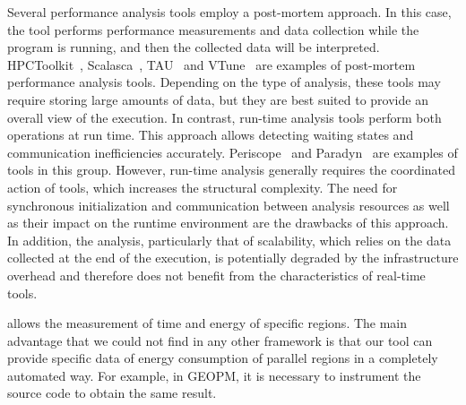 Several performance analysis tools employ a post-mortem approach. 
In this case, the tool performs performance measurements and data collection while the program is running, and then the collected data will be interpreted.
HPCToolkit~\cite{Adhianto2010}, Scalasca~\cite{Geimer2010}, TAU~\cite{Shende2006} and VTune~\cite{VTune} are examples of post-mortem performance analysis tools. 
Depending on the type of analysis, these tools may require storing large amounts of data, but they are best suited to provide an overall view of the execution.
In contrast, run-time analysis tools perform both operations at run time.
This approach allows detecting waiting states and communication inefficiencies accurately. 
Periscope~\cite{Gerndt2010} and Paradyn~\cite{Miller1995} are examples of tools in this group.
However, run-time analysis generally requires the coordinated action of tools, which increases the structural complexity.
The need for synchronous initialization and communication between analysis resources as well as their impact on the runtime environment are the drawbacks of this approach.
In addition, the analysis, particularly that of scalability, which relies on the data collected at the end of the execution, is potentially degraded by the infrastructure overhead and therefore does not benefit from the characteristics of real-time tools.


 allows the measurement of time and energy of specific regions. The main advantage that we could not find in any other framework is that our tool can provide specific data of energy consumption of parallel regions in a completely automated way. For example, in GEOPM, it is necessary to instrument the source code to obtain the same result.

